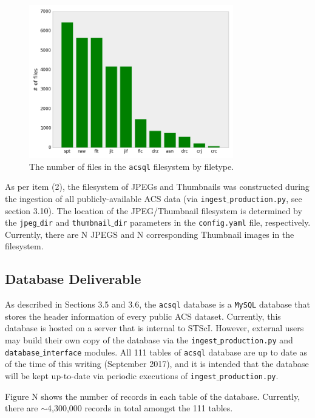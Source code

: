 \documentclass[10pt,journal,compsoc]{IEEEtran}
\begin{document}
\begin{figure}[!t]
\centering
\includegraphics[width=3.5in]{./figures/num_files_by_filetype.png}
\caption{The number of files in the \texttt{acsql} filesystem by filetype.}
\label{fig1}
\end{figure}

As per item (2), the filesystem of JPEGs and Thumbnails was constructed during the ingestion of all publicly-available
ACS data (via \texttt{ingest$\_$production.py}, see section 3.10).  The location of the JPEG/Thumbnail filesystem is determined
by the \texttt{jpeg$\_$dir} and \texttt{thumbnail$\_$dir} parameters in the \texttt{config.yaml} file, respectively.
Currently, there are N JPEGS and N corresponding Thumbnail images in the filesystem.


\subsection{Database Deliverable}

As described in Sections 3.5 and 3.6, the \texttt{acsql} database is a \texttt{MySQL} database that stores the header
information of every public ACS dataset.  Currently, this database is hosted on a server that is internal to STScI.  However,
external users may build their own copy of the database via the \texttt{ingest$\_$production.py} and \texttt{database$\_$interface}
modules.  All 111 tables of \texttt{acsql} database are up to date as of the time of this writing (September 2017), and it is
intended that the database will be kept up-to-date via periodic executions of \texttt{ingest$\_$production.py}.

Figure N shows the number of records in each table of the database.  Currently, there are $\sim$4,300,000 records in total amongst
the 111 tables.
\end{document}
